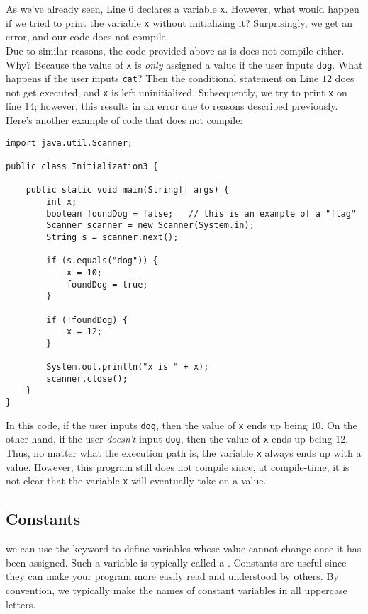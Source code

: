 As we've already seen, Line $6$ declares a variable \verb!x!. However, what would happen if we tried to print the variable \verb!x! without initializing it? Surprisingly, we get an error, and our code does not compile. \\

Due to similar reasons, the code provided above as is does not compile either. Why? Because the value of \verb!x! is \textit{only} assigned a value if the user inputs \verb!dog!. What happens if the user inputs \verb!cat!? Then the conditional statement on Line $12$ does not get executed, and \verb!x! is left uninitialized. Subsequently, we try to print \verb!x! on line $14$; however, this results in an error due to reasons described previously. \\


Here's another example of code that does not compile:

\begin{lstlisting}
import java.util.Scanner;

public class Initialization3 {

	public static void main(String[] args) {
		int x;
		boolean foundDog = false;   // this is an example of a "flag"
		Scanner scanner = new Scanner(System.in);
		String s = scanner.next();

		if (s.equals("dog")) {
			x = 10;
			foundDog = true;
		}

		if (!foundDog) {
			x = 12;
		}
		
		System.out.println("x is " + x);
		scanner.close();
	}
}
\end{lstlisting}

In this code, if the user inputs \verb!dog!, then the value of \verb!x! ends up being $10$. On the other hand, if the user \textit{doesn't} input \verb!dog!, then the value of \verb!x! ends up being $12$. Thus, no matter what the execution path is, the variable \verb!x! always ends up with a value. However, this program still does not compile since, at compile-time, it is not clear that the variable \verb!x! will eventually take on a value. 

\subsection{Constants}

we can use the  keyword to define variables whose value cannot change once it has been assigned. Such a variable is typically called a . Constants are useful since they can make your program more easily read and understood by others. By convention, we typically make the names of constant variables in all uppercase letters.  \\


